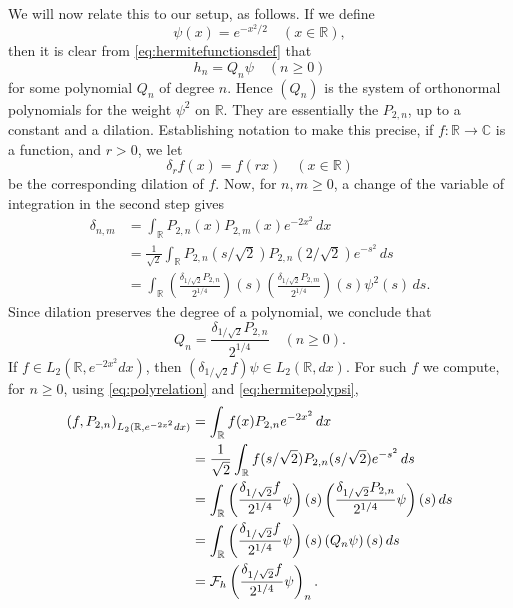 \documentclass[12pt, reqno]{amsart}
\numberwithin{equation}{section}
\theoremstyle{plain}
\theoremstyle{definition}
\begin{document}
We will now relate this to our setup, as follows.
If we define
$$
\psi(x)=e^{-x^2/2}\quad(x\in{{\mathbb R}}),
$$
then it is clear from \eqref{eq:hermitefunctionsdef} that
\begin{equation}\label{eq:hermitepolypsi}
h_n=Q_n\psi \quad(n\geq 0)
\end{equation} for some polynomial $Q_n$ of degree $n$. Hence ${({Q_n})}$ is the system of orthonormal polynomials for the weight $\psi^2$
on ${{\mathbb R}}$. They are essentially the $P_{2,n}$, up to a constant and a dilation. Establishing notation to make this precise, if $f:{{\mathbb R}}\to{{\mathbb C}}$ is a function, and $r>0$, we let
\begin{equation*}
\delta_r f(x)=f(rx) \quad (x\in{{\mathbb R}})
\end{equation*}
be the corresponding dilation of $f$. Now, for $n,m\geq 0$, a change of the variable of integration in the second step gives
\begin{align*}
\delta_{n,m}&=\int_{{\mathbb R}} P_{2,n}(x)P_{2,m}(x)e^{-2x^2}\,dx\\
&=\frac{1}{\sqrt 2}\int_{{\mathbb R}} P_{2,n}(s/\sqrt 2)P_{2,n}(2/\sqrt 2)e^{-s^2}\,ds\\
&=\int_{{\mathbb R}} \left(\frac{\delta_{1/\sqrt 2}P_{2,n}}{2^{1/4}}\right)(s) \left(\frac{\delta_{1/\sqrt 2}P_{2,m}}{2^{1/4}}\right)(s)\psi^2(s)\,ds.
\end{align*}
Since dilation preserves the degree of a polynomial, we conclude that
\begin{equation}\label{eq:polyrelation}
Q_n=\frac{\delta_{1/\sqrt 2}P_{2,n}}{2^{1/4}}\quad(n\geq 0).
\end{equation}
If $f\in{L_2({{\mathbb R}}, e^{-2x^2}dx)}$, then $(\delta_{1/\sqrt 2}f)\psi\in {L_2({{\mathbb R}},dx)}$. For such $f$ we compute, for $n\geq 0$, using \eqref{eq:polyrelation} and \eqref{eq:hermitepolypsi},
\begin{align}\label{eq:relatingcoefficients}
(f,P_{2,n})_{L_2({{\mathbb R}}, e^{-2x^2}dx)}&=\int_{{\mathbb R}} f(x)P_{2,n}e^{-2x^2}\,dx\notag \\
&=\frac{1}{\sqrt 2}\int_{{\mathbb R}} f(s/\sqrt 2) P_{2,n}(s/\sqrt 2)e^{-s^2}\,ds\notag \\
&=\int_{{\mathbb R}} \left(\frac{\delta_{1/\sqrt 2}f}{2^{1/4}}\psi\right)(s)\left(\frac{\delta_{1/\sqrt 2}P_{2,n}}{2^{1/4}}\psi \right)(s)\,ds\notag \\
&=\int_{{\mathbb R}} \left(\frac{\delta_{1/\sqrt 2}f}{2^{1/4}}\psi\right)(s)\left(Q_n\psi \right)(s)\,ds\notag \\
&={{\mathcal F}_h}\left(\frac{\delta_{1/\sqrt 2}f}{2^{1/4}}\psi\right)_n.
\end{align}
\end{document}
